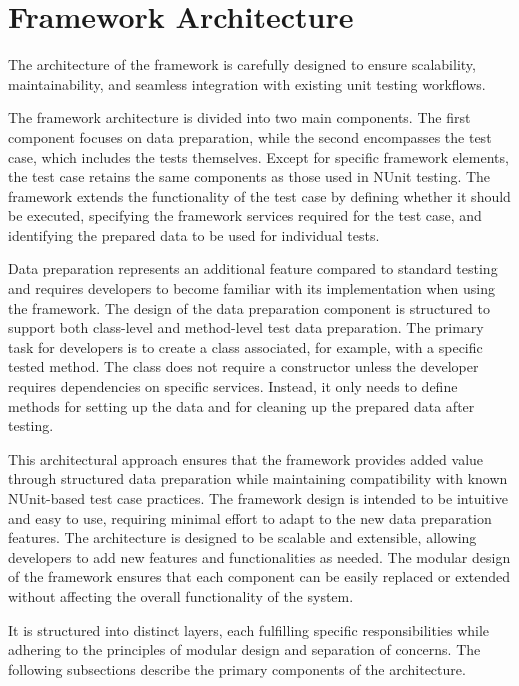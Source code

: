 
\section{Framework Architecture}

The architecture of the framework is carefully designed to ensure scalability,
maintainability, and seamless integration with existing unit testing workflows.

The framework architecture is divided into two main components. The first component focuses on data preparation, while the second encompasses the test case, which includes the tests themselves. Except for specific framework elements, the test case retains the same components as those used in NUnit testing. The framework extends the functionality of the test case by defining whether it should be executed, specifying the framework services required for the test case, and identifying the prepared data to be used for individual tests.

Data preparation represents an additional feature compared to standard testing and requires developers to become familiar with its implementation when using the framework. The design of the data preparation component is structured to support both class-level and method-level test data preparation. The primary task for developers is to create a class associated, for example, with a specific tested method. The class does not require a constructor unless the developer requires dependencies on specific services. Instead, it only needs to define methods for setting up the data and for cleaning up the prepared data after testing.

This architectural approach ensures that the framework provides added value through structured data preparation while maintaining compatibility with known NUnit-based test case practices. The framework design is intended to be intuitive and easy to use, requiring minimal effort to adapt to the new data preparation features. The architecture is designed to be scalable and extensible, allowing developers to add new features and functionalities as needed. The modular design of the framework ensures that each component can be easily replaced or extended without affecting the overall functionality of the system.

It is structured into distinct layers,
each fulfilling specific responsibilities while adhering to the principles of modular design and separation of concerns. The following subsections describe the primary components of the architecture.

